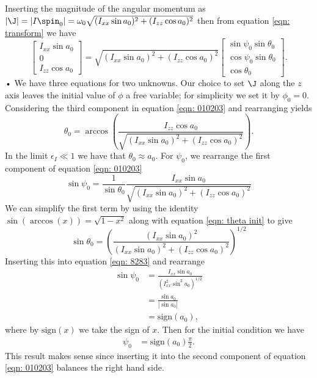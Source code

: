 \documentclass[/home/greg/Thesis/main/main.tex]{subfiles}
\begin{document}
Inserting the magnitude of the angular momentum as 
$|\J| = |I \spin_{0}|=\omega_{0}\sqrt{(I_{xx}\sin a_{0})^{2} + (I_{zz}\cos a_{0})^{2}}$
then from equation  \eqref{eqn: transform} we have
\begin{equation}
\left[ \begin{array}{c}
I_{xx}\sin a_{0} \\
0 \\
I_{zz} \cos a_{0}
\end{array}\right] =
\sqrt{(I_{xx}\sin a_{0})^{2} + (I_{zz}\cos a_{0})^{2}}
\left[ \begin{array}{c}
\sin \psi_{0} \sin \theta_{0} \\
\cos \psi_{0} \sin \theta_{0} \\
\cos \theta_{0}
\end{array}\right].
\label{eqn: 010203}
\end{equation}•
We have three equations for two unknowns. Our choice to set $\J$ along
the $z$ axis leaves the initial value of $\phi$ a free variable; for simplicity
we set it by $\phi_{0} = 0$. 
Considering the third component in equation \eqref{eqn: 010203} and rearranging 
yields
\begin{equation}
\theta_{0} = \arccos\left(\frac{I_{zz}\cos a_{0}}{ \sqrt{(I_{xx}\sin
        a_{0})^{2} + (I_{zz}\cos a_{0})^{2}}} \right).
\label{eqn: theta init}
\end{equation} 
In the limit $\epsilon_{I} \ll 1$ we have that $\theta_{0} \approx a_{0}$.
For $\psi_0$, we rearrange the first component of equation \eqref{eqn: 010203} 
\begin{equation}
\sin\psi_{0} =\frac{1}{ \sin\theta_{0}}\frac{ I_{xx}\sin a_{0}}{\sqrt{(I_{xx}\sin a_{0})^{2} + (I_{zz}\cos a_{0})^{2}}}
\label{eqn: 8283}
\end{equation}
We can simplify the first term by using the identity $\sin(\arccos(x)) = \sqrt{1 - x^{2}}$
along with equation \eqref{eqn:  theta init} to give
\begin{equation}
\sin\theta_{0} = \left(\frac{(I_{xx}\sin a_{0})^{2}}
                                      {(I_{xx}\sin a_{0})^{2} + (I_{zz}\cos a_{0})^{2}} \right)^{1/2}
\end{equation}
Inserting this into equation \eqref{eqn: 8283} and rearrange 
\begin{align}
\sin \psi_0 & = \frac{I_{xx} \sin a_{0}}{\left(I_{xx}^{2} \sin^{2} a_{0}\right)^{1/2}} \\
 & = \frac{\sin a_{0} }{|\sin a_{0}|} \\ 
& = \mathrm{sign}(a_{0}),
\end{align}
where by $\mathrm{sign}(x)$ we take the sign of $x$. Then for the initial condition we 
have
\begin{align}
\psi_{0} & =\mathrm{sign}(a_{0}) \frac{\pi}{2}.
\label{eqn: psi  init}
\end{align}
This result makes sense since inserting it into the second component of equation \eqref{eqn: 010203}
balances  the right hand side.
\end{document}
